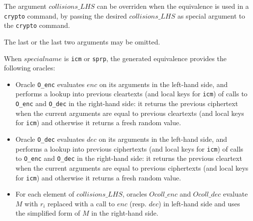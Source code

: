 \begin{itemize}
\begin{enumerate}
The argument $\mathit{collisions\_LHS}$ can be overriden when the 
equivalence is used in a \texttt{crypto} command, by passing
the desired $\mathit{collisions\_LHS}$ as special argument to the 
\texttt{crypto} command. 

\end{enumerate}
The last or the last two arguments may be omitted.

When $\mathit{specialname}$ is \texttt{icm} or \texttt{sprp},
the generated equivalence provides the following oracles:
\begin{itemize}
\item Oracle \texttt{O\_enc} evaluates $\mathit{enc}$ on its arguments in the
  left-hand side, and performs a lookup into previous cleartexts (and
  local keys for \texttt{icm}) of calls to \texttt{O\_enc}
  and \texttt{O\_dec} in the right-hand side: it returns the previous
  ciphertext when the current arguments are equal to previous cleartexts
  (and local keys for \texttt{icm}) and otherwise it returns a fresh
  random value.

\item Oracle \texttt{O\_dec} evaluates $\mathit{dec}$ on its arguments in the
  left-hand side, and performs a lookup into previous ciphertexts (and
  local keys for \texttt{icm}) of calls to \texttt{O\_enc}
  and \texttt{O\_dec} in the right-hand side: it returns the previous
  cleartext when the current arguments are equal to previous ciphertexts
  (and local keys for \texttt{icm}) and otherwise it returns a fresh
  random value.

\item For each element of $\mathit{collisions\_LHS}$, oracles
  $\mathit{Ocoll\_enc}$ and $\mathit{Ocoll\_dec}$ evaluate $M$ with
  $r_i$ replaced with a call to $\mathit{enc}$ (resp. $\mathit{dec}$)
  in left-hand side and uses the simplified form of $M$ in the
  right-hand side.


\end{itemize}
\end{itemize}
